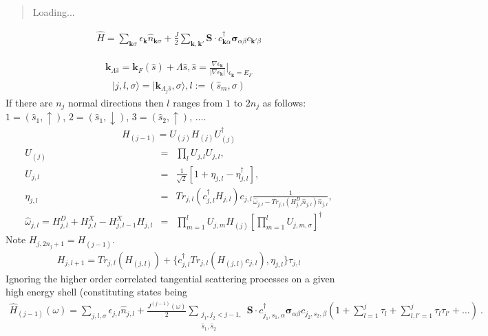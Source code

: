 \documentclass[11pt,a4paper]{article}
\begin{document}
\maketitle
\begin{abstract}
Loading...
\end{abstract}
\begin{eqnarray}
\hat{H} = \sum_{\mathbf{k}\sigma}\epsilon_{\mathbf{k}}\hat{n}_{\mathbf{k}\sigma}+\frac{J}{2}\sum_{\mathbf{k},\mathbf{k}'}\mathbf{S}\cdot c^{\dagger}_{\mathbf{k}\alpha}\boldsymbol{\sigma}_{\alpha\beta}c_{\mathbf{k}'\beta}
\end{eqnarray}

\begin{eqnarray}
\mathbf{k}_{\Lambda\hat{s}}=\mathbf{k}_{F}(\hat{s})+\Lambda\hat{s}, \hat{s}=\frac{\nabla\epsilon_{\mathbf{k}}}{|\nabla\epsilon_{\mathbf{k}}|}|_{\epsilon_{\mathbf{k}}=E_{F}}
\end{eqnarray}
\begin{eqnarray}
|j,l,\sigma\rangle = |\mathbf{k}_{\Lambda_{j}\hat{s}},\sigma\rangle, l:=(\hat{s}_{m},\sigma)
\end{eqnarray}
If there are $n_{j}$ normal directions then $l$ ranges from $1$ to $2n_{j}$ as follows: $1=(\hat{s}_{1},\uparrow)$, $2=(\hat{s}_{1},\downarrow)$, $3=(\hat{s}_{2},\uparrow)$, $\ldots$. 
\begin{eqnarray}
H_{(j-1)}=U_{(j)}H_{(j)}U^{\dagger}_{(j)}
\end{eqnarray}
\begin{eqnarray}
U_{(j)}&=&\prod_{l}U_{j,l}U_{j,l}, \nonumber\\ 
U_{j,l}&=&\frac{1}{\sqrt{2}}[1+\eta_{j,l}-\eta^{\dagger}_{j,l}],\nonumber\\
\eta_{j,l}&=&Tr_{j,l}(c^{\dagger}_{j,l}H_{j,l})c_{j,l}\frac{1}{\hat{\omega}_{j,l}-Tr_{j,l}(H_{j,l}^{D}\hat{n}_{j,l})\hat{n}_{j,l}},\nonumber\\
\hat{\omega}_{j,l}=H^{D}_{j,l}+H^{X}_{j,l}-H^{X}_{j,l-1}
H_{j,l}&=&\prod_{m=1}^{l}U_{j,m}H_{(j)}[\prod_{m=1}^{l}U_{j,m,\sigma}]^{\dagger}
\end{eqnarray}
Note $H_{j,2n_{j}+1}=H_{(j-1)}$.
\begin{eqnarray}
H_{j,l+1}=Tr_{j,l}(H_{(j,l)})+\lbrace c^{\dagger}_{j,l}Tr_{j,l}(H_{(j,l)}c_{j,l}),\eta_{j,l}\rbrace\tau_{j,l}
\end{eqnarray}
Ignoring the higher order correlated tangential scattering processes on a given high energy shell 
(constituting states 
being 
\begin{eqnarray}
\hat{H}_{(j-1)}(\omega) = \sum_{j,l,\sigma}\epsilon_{j,l}\hat{n}_{j,l}+\frac{J^{(j-1)}(\omega)}{2}\sum_{\substack{j_{1},j_{2}<j-1,\\ \hat{s}_{1},\hat{s}_{2}}}\mathbf{S}\cdot c^{\dagger}_{j_{1},\hat{s}_{1},\alpha}\boldsymbol{\sigma}_{\alpha\beta}c_{j_{2},\hat{s}_{2},\beta}(1+
\sum^{j}_{l=1}\tau_{l}+\sum^{j}_{l,l'=1}\tau_{l}\tau_{l'}+\ldots)~.
\end{eqnarray}
\end{document}
